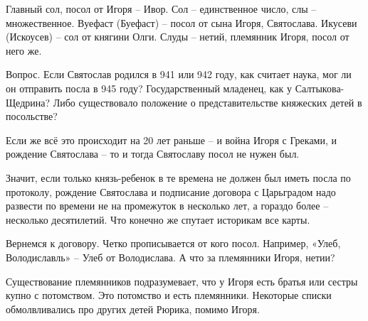 

Главный сол, посол от Игоря – Ивор. Сол – единственное число, слы – множественное. Вуефаст (Буефаст) – посол от сына Игоря, Святослава. Икусеви (Искоусев) – сол от княгини Олги. Слуды – нетий, племянник Игоря, посол от него же.

Вопрос. Если Святослав родился в 941 или 942 году, как считает наука, мог ли он отправить посла в 945 году? Государственный младенец, как у Салтыкова-Щедрина? Либо существовало положение о представительстве княжеских детей в посольстве?

Если же всё это происходит на 20 лет раньше – и война Игоря с Греками, и рождение Святослава – то и тогда Святославу посол не нужен был. 

Значит, если только князь-ребенок в те времена не должен был иметь посла по протоколу, рождение Святослава и подписание договора с Царьградом надо развести по времени не на промежуток в несколько лет, а гораздо более – несколько десятилетий. Что конечно же спутает историкам все карты.


Вернемся к договору. Четко прописывается от кого посол. Например, «Улеб, Володиславль» – Улеб от Володислава. А что за племянники Игоря, нетии?

Существование племянников подразумевает, что у Игоря есть братья или сестры купно с потомством. Это потомство и есть племянники. Некоторые списки обмолвливались про других детей Рюрика, помимо Игоря. 


